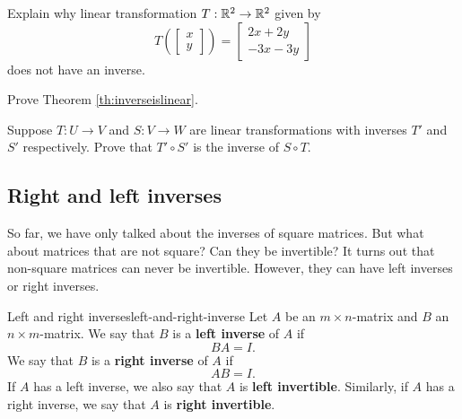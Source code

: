 \documentclass{ximera}
\begin{document}
\begin{problem}\label{prob:noinversetrans}Explain why linear transformation $T:\mathbb{R}^2\rightarrow\mathbb{R}^2$ given by $$T\left(\begin{bmatrix}x\\y\end{bmatrix}\right)=\begin{bmatrix}2x+2y\\-3x-3y\end{bmatrix}$$ does not have an inverse.
\end{problem}
\begin{problem}\label{prob:inverseislinear}
Prove Theorem \ref{th:inverseislinear}. 
\end{problem}
\begin{problem}\label{prob:compofinvisinvofcomp} Suppose $T:U\rightarrow V$ and $S:V\rightarrow W$ are linear transformations with inverses $T'$ and $S'$ respectively.  Prove that $T'\circ S'$ is the inverse of $S\circ T$.
\end{problem}



\subsection{Right and left inverses}

So far, we have only talked about the inverses of square matrices. But
what about matrices that are not square? Can they be invertible? It
turns out that non-square matrices can never be invertible. However,
they can have left inverses or right inverses.


\begin{definition}{Left and right inverses}{left-and-right-inverse}
  Let $A$ be an $m\times n$-matrix and $B$ an $n\times m$-matrix.  We
  say that $B$ is a \textbf{left inverse}%
   of $A$ if
  \begin{equation*}
    BA=I.
  \end{equation*}
  We say that $B$ is a \textbf{right inverse}%
   of $A$ if
  \begin{equation*}
    AB=I.
  \end{equation*}
  If $A$ has a left inverse, we also say that $A$ is
  \textbf{left invertible}. Similarly, if $A$ has a right inverse, we
  say that $A$ is \textbf{right invertible}.
\end{definition}
\end{document}
